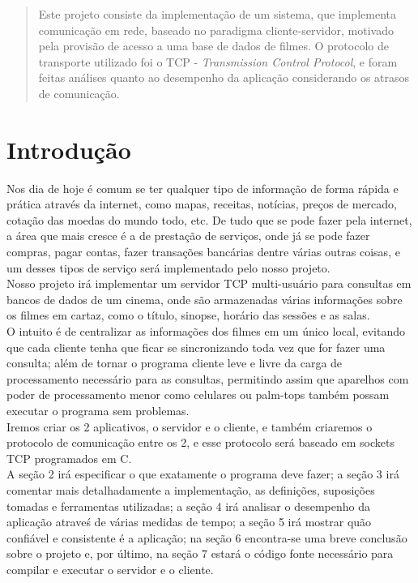 \documentclass[11pt,twoside]{article}
\begin{document}
\newenvironment{tinycodelisting}
{\begin{list}{}{\setlength{\leftmargin}{1em}}\item\tiny\bfseries}
{\end{list}}


\begin{abstract}
Este projeto consiste da implementação de um sistema, que implementa comunicação em rede, baseado no paradigma cliente-servidor, motivado pela provisão de acesso a uma base de dados de filmes. O protocolo de transporte utilizado foi o TCP - \textit{Transmission Control Protocol}, e foram feitas análises quanto ao desempenho da aplicação considerando os atrasos de comunicação.
\end{abstract}

\section{Introdução}
Nos dia de hoje é comum se ter qualquer tipo de informação de forma rápida e prática através da internet, como mapas, receitas, notícias, preços de mercado, cotação das moedas do mundo todo, etc. De tudo que se pode fazer pela internet, a área que mais cresce é a de prestação de serviços, onde já se pode fazer compras, pagar contas, fazer transações bancárias dentre várias outras coisas, e um desses tipos de serviço será implementado pelo nosso projeto.\\
Nosso projeto irá implementar um servidor TCP multi-usuário para consultas em bancos de dados de um cinema, onde são armazenadas várias informações sobre os filmes em cartaz, como o título, sinopse, horário das sessões e as salas.\\
O intuito é de centralizar as informações dos filmes em um único local, evitando que cada cliente tenha que ficar se sincronizando toda vez que for fazer uma consulta; além de tornar o programa cliente leve e livre da carga de processamento necessário para as consultas, permitindo assim que aparelhos com poder de processamento menor como celulares ou palm-tops também possam executar o programa sem problemas.\\
Iremos criar os 2 aplicativos, o servidor e o cliente, e também criaremos o protocolo de comunicação entre os 2, e esse protocolo será baseado em sockets TCP programados em C.\\
A seção 2 irá especificar o que exatamente o programa deve fazer; a seção 3 irá comentar mais detalhadamente a implementação, as definições, suposições tomadas e ferramentas utilizadas; a seção 4 irá analisar o desempenho da aplicação atraveś de várias medidas de tempo; a seção 5 irá mostrar quão confiável e consistente é a aplicação; na seção 6 encontra-se uma breve conclusão sobre o projeto e, por último, na seção 7 estará o código fonte necessário para compilar e executar o servidor e o cliente.
\end{document}
